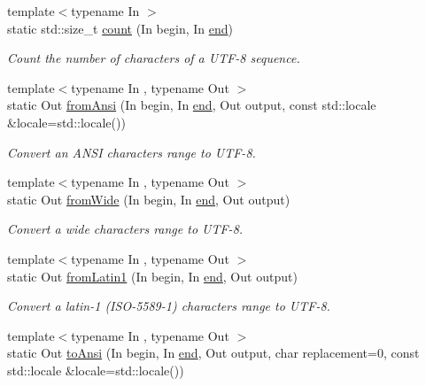 \begin{DoxyCompactItemize}
{\footnotesize template$<$typename In $>$ }\\static std\-::size\-\_\-t \hyperlink{classsf_1_1_utf_3_018_01_4_af1f15d9a772ee887be39e97431e15d32}{count} (In begin, In \hyperlink{gl3_8h_a432111147038972f06e049e18a837002}{end})
\begin{DoxyCompactList}\small\item\em Count the number of characters of a U\-T\-F-\/8 sequence. \end{DoxyCompactList}\item 
{\footnotesize template$<$typename In , typename Out $>$ }\\static Out \hyperlink{classsf_1_1_utf_3_018_01_4_a1b62ba85ad3c8ce68746e16192b3eef0}{from\-Ansi} (In begin, In \hyperlink{gl3_8h_a432111147038972f06e049e18a837002}{end}, Out output, const std\-::locale \&locale=std\-::locale())
\begin{DoxyCompactList}\small\item\em Convert an A\-N\-S\-I characters range to U\-T\-F-\/8. \end{DoxyCompactList}\item 
{\footnotesize template$<$typename In , typename Out $>$ }\\static Out \hyperlink{classsf_1_1_utf_3_018_01_4_aa99e636a7addc157b425dfc11b008f42}{from\-Wide} (In begin, In \hyperlink{gl3_8h_a432111147038972f06e049e18a837002}{end}, Out output)
\begin{DoxyCompactList}\small\item\em Convert a wide characters range to U\-T\-F-\/8. \end{DoxyCompactList}\item 
{\footnotesize template$<$typename In , typename Out $>$ }\\static Out \hyperlink{classsf_1_1_utf_3_018_01_4_a85dd3643b7109a1a2f802747e55e28e8}{from\-Latin1} (In begin, In \hyperlink{gl3_8h_a432111147038972f06e049e18a837002}{end}, Out output)
\begin{DoxyCompactList}\small\item\em Convert a latin-\/1 (I\-S\-O-\/5589-\/1) characters range to U\-T\-F-\/8. \end{DoxyCompactList}\item 
{\footnotesize template$<$typename In , typename Out $>$ }\\static Out \hyperlink{classsf_1_1_utf_3_018_01_4_a3d8b02f29021bd48831e7706d826f0c5}{to\-Ansi} (In begin, In \hyperlink{gl3_8h_a432111147038972f06e049e18a837002}{end}, Out output, char replacement=0, const std\-::locale \&locale=std\-::locale())

\end{DoxyCompactItemize}
